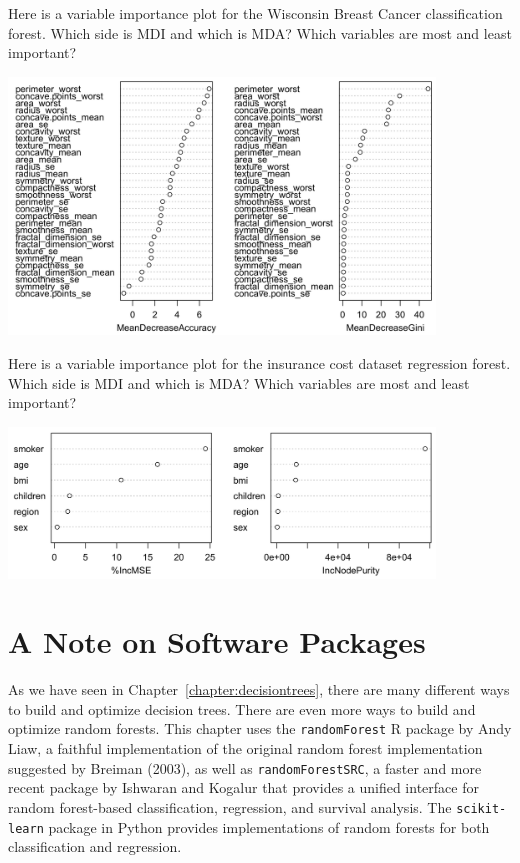 \vspace{4mm}

\begin{question}{}
Here is a variable importance plot for the Wisconsin Breast Cancer classification forest. Which side is MDI and which is MDA? Which variables are most and least important?
\begin{center}
\includegraphics[width=0.85\textwidth]{img/vimp-classification-wisc.png}
\end{center}
\end{question}

\begin{question}{}
Here is a variable importance plot for the insurance cost dataset regression forest. Which side is MDI and which is MDA? Which variables are most and least important?
\begin{center}
\includegraphics[width=0.85\textwidth]{img/vimp-classification-insur.png}
\end{center}
\end{question}


\section{A Note on Software Packages}

As we have seen in Chapter~\ref{chapter:decisiontrees}, there are many different ways to build and optimize decision trees. There are even more ways to build and optimize random forests. This chapter uses the \texttt{randomForest} R package by Andy Liaw, a faithful implementation of the original random forest implementation suggested by Breiman (2003), as well as \texttt{randomForestSRC}, a faster and more recent package by Ishwaran and Kogalur that provides a unified interface for random forest-based classification, regression, and survival analysis. The \texttt{scikit-learn} package in Python provides implementations of random forests for both classification and regression. 
